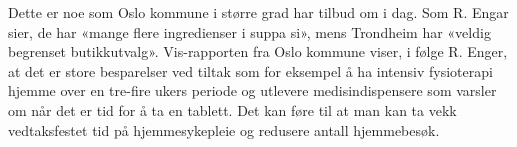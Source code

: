 Dette er noe som Oslo kommune i større grad har tilbud om i dag. Som R. Engar sier, de har «mange flere ingredienser i suppa si», mens Trondheim
har «veldig begrenset butikkutvalg». Vis-rapporten fra Oslo kommune viser, i følge R. Enger, at det er store besparelser ved tiltak som
for eksempel å ha intensiv fysioterapi hjemme over en tre-fire ukers periode og utlevere  medisindispensere som varsler om når det er tid for
å ta en tablett. Det kan føre til at man kan ta vekk vedtaksfestet tid på hjemmesykepleie og redusere antall hjemmebesøk.
